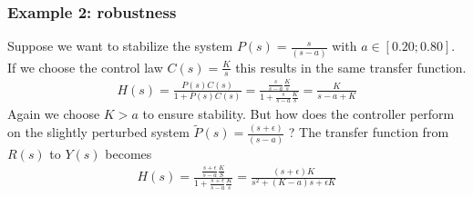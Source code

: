 \begin{frame}
	\frametitle{Example 2: robustness}
	\begin{example}
		Suppose we want to stabilize the system $P(s)=\frac{s}{(s - a)}$ with $a\in[0.20;0.80]$. If we choose the control law $C(s)=\frac{K}{s}$ this results in the same transfer function.
		\vspace{-0.5em}
		\begin{align*}
			H(s) = \frac{P(s)C(s)}{1+P(s)C(s)} = \frac{\frac{s}{s-a}\frac{K}{s}}{1+\frac{s}{s-a} \frac{K}{s}} = \frac{K}{s-a+K}
		\end{align*}
		Again we choose $K>a$ to ensure stability.
		But how does the controller perform on the slightly perturbed system $\tilde{P}(s)=\frac{(s+\epsilon)}{(s - a)}$  ?
		The transfer function from $R(s)$ to $Y(s)$ becomes
				\vspace{-0.5em}
		\begin{align*}
			H(s) = \frac{\frac{s+\epsilon}{s-a} \frac{K}{S}}{1+\frac{s+\epsilon}{s-a}\frac{K}{s}}
			= \frac{(s+\epsilon)K}{s^2 + (K-a)s + \epsilon K}
		\end{align*}
	\end{example}
\end{frame}


